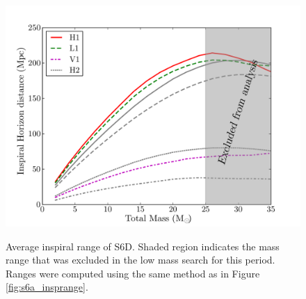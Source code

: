 \begin{figure}[p]
\begin{center}
\label{fig:s6d_insprange}
\includegraphics[width=6in]{figures/s6d_insprange_alt.pdf}
\end{center}
\caption{Average inspiral range of S6D. Shaded region indicates the mass range that was excluded in the low mass search for this period. Ranges were computed using the same method as in Figure \ref{fig:s6a_insprange}.}
\end{figure}
